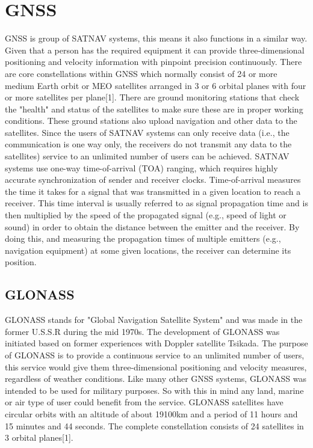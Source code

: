 \documentclass[conference]{IEEEtran}
\begin{document}
\section{GNSS}
GNSS is group of SATNAV systems, this means it also functions in a similar way. Given that a person has the required equipment it can provide three-dimensional positioning and velocity information with pinpoint precision continuously. There are core constellations within GNSS which normally consist of 24 or more medium Earth orbit or MEO satellites arranged in 3 or 6 orbital planes with four or more satellites per plane[1]. There are ground monitoring stations that check the "health" and status of the satellites to make sure these are in proper working conditions. These ground stations also upload navigation and other data to the satellites. Since the users of SATNAV systems can only receive data (i.e., the communication is one way only, the receivers do not transmit any data to the satellites) service to an unlimited number of users can be achieved. SATNAV systems use one-way time-of-arrival (TOA) ranging, which requires highly accurate synchronization of sender and receiver clocks. Time-of-arrival measures the time it takes for a signal that was transmitted in a given location to reach a receiver. This time interval is usually referred to as signal propagation time and is then multiplied by the speed of the propagated signal (e.g., speed of light or sound) in order to obtain the distance between the emitter and the receiver. By doing this, and measuring the propagation times of multiple emitters (e.g., navigation equipment) at some given locations, the receiver can determine its position.

\subsection{GLONASS}\label{AA}

GLONASS stands for "Global Navigation Satellite System" and was made in the former U.S.S.R during the mid 1970s. The development of GLONASS was initiated based on former experiences with Doppler satellite Tsikada. The purpose of GLONASS is to provide a continuous service to an unlimited number of users, this service would give them three-dimensional positioning and velocity measures, regardless of weather conditions.
Like many other GNSS systems, GLONASS was intended to be used for military purposes. So with this in mind any land, marine or air type of user could benefit from the service.
GLONASS satellites have circular orbits with an altitude of about 19100km and a period of 11 hours and 15 minutes and 44 seconds. The complete constellation consists of 24 satellites in 3 orbital planes[1].
\end{document}
